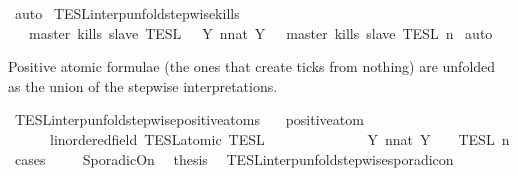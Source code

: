 \begin{isabellebody}
%
\isadelimproof
%
\endisadelimproof
%
\isatagproof
{}\isamarkupfalse%
\ auto%
\endisatagproof
{\isafoldproof}%
%
\isadelimproof
\isanewline
%
\endisadelimproof
\isanewline
{}\isamarkupfalse%
\ TESL{\isacharunderscore}interp{\isacharunderscore}unfold{\isacharunderscore}stepwise{\isacharunderscore}kills{\isacharcolon}\isanewline
\ \ {\isacartoucheopen}{\isasymlbrakk}\ master\ kills\ slave\ {\isasymrbrakk}\isactrlsub T\isactrlsub E\isactrlsub S\isactrlsub L\ {\isacharequal}\ {\isasymInter}\ {\isacharbraceleft}Y{\isachardot}\ {\isasymexists}n{\isacharcolon}{\isacharcolon}nat{\isachardot}\ Y\ {\isacharequal}\ {\isasymlbrakk}\ master\ kills\ slave\ {\isasymrbrakk}\isactrlsub T\isactrlsub E\isactrlsub S\isactrlsub L\isactrlbsup {\isasymge}\ n\isactrlesup {\isacharbraceright}{\isacartoucheclose}\isanewline
%
\isadelimproof
%
\endisadelimproof
%
\isatagproof
{}\isamarkupfalse%
\ auto%
\endisatagproof
{\isafoldproof}%
%
\isadelimproof
%
\endisadelimproof
%
\begin{isamarkuptext}%
Positive atomic formulae (the ones that create ticks from nothing) are unfolded
  as the union of the stepwise interpretations.%
\end{isamarkuptext}\isamarkuptrue%
\isamarkupfalse%
\ TESL{\isacharunderscore}interp{\isacharunderscore}unfold{\isacharunderscore}stepwise{\isacharunderscore}positive{\isacharunderscore}atoms{\isacharcolon}\isanewline
\ \ \ {\isacartoucheopen}positive{\isacharunderscore}atom\ {\isasymphi}{\isacartoucheclose}\isanewline
\ \ \ \ \ {\isacartoucheopen}{\isasymlbrakk}\ {\isasymphi}{\isacharcolon}{\isacharcolon}{\isacharprime}{\isasymtau}{\isacharcolon}{\isacharcolon}linordered{\isacharunderscore}field\ TESL{\isacharunderscore}atomic\ {\isasymrbrakk}\isactrlsub T\isactrlsub E\isactrlsub S\isactrlsub L\isanewline
\ \ \ \ \ \ \ \ \ \ \ \ {\isacharequal}\ {\isasymUnion}\ {\isacharbraceleft}Y{\isachardot}\ {\isasymexists}n{\isacharcolon}{\isacharcolon}nat{\isachardot}\ Y\ {\isacharequal}\ {\isasymlbrakk}\ {\isasymphi}\ {\isasymrbrakk}\isactrlsub T\isactrlsub E\isactrlsub S\isactrlsub L\isactrlbsup {\isasymge}\ n\isactrlesup {\isacharbraceright}{\isacartoucheclose}\isanewline
%
\isadelimproof
%
\endisadelimproof
%
\isatagproof
{}\isamarkupfalse%
\ {\isacharparenleft}cases\ {\isasymphi}{\isacharparenright}\isanewline
\ \ \isamarkupfalse%
\ SporadicOn\ \isamarkupfalse%
\ {\isacharquery}thesis\ \isamarkupfalse%
\ TESL{\isacharunderscore}interp{\isacharunderscore}unfold{\isacharunderscore}stepwise{\isacharunderscore}sporadicon\ \isamarkupfalse%

\end{isabellebody}
